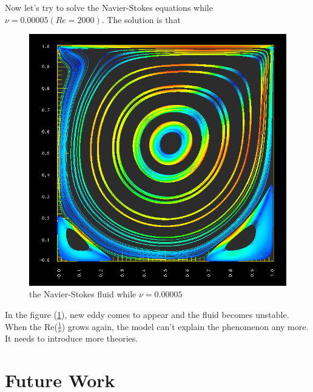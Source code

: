 \documentclass[a4paper]{article}
\begin{document}
Now let's try to solve the Navier-Stokes equations while $\nu=0.00005(Re=2000)$. The solution is that
\begin{figure}[h]
\centering
\includegraphics[scale = 0.5]{images/e.png}
\caption{the Navier-Stokes fluid while $\nu=0.00005$}
\label{im::d}
\end{figure}


In the figure (\ref{im::d}), new eddy comes to appear and the fluid becomes unstable. When the Re($\frac{1}{\nu}$) grows again, the model can't explain the phenomenon any more. It needs to introduce more theories.
\section{Future Work}
\end{document}
